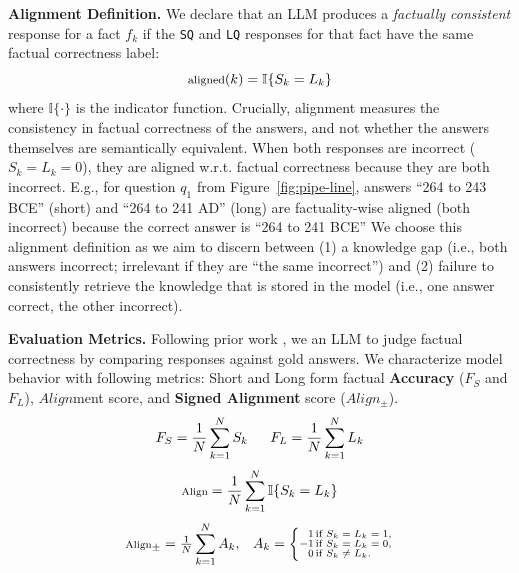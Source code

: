 \documentclass[11pt]{article}
\newcommand{\rparagraph}[1]{\vspace{1.2mm}\noindent\textbf{#1}}
\begin{document}
\rparagraph{Alignment Definition.} 
We declare that an LLM produces a \textit{factually consistent} response for a fact $f_k$ if the \texttt{SQ} and \texttt{LQ} responses for that fact have the same factual correctness label: %
%
\begin{equation}
    \footnotesize
    \text{aligned}(k) = \mathbb{I}\{S_k = L_k\}
\end{equation}
%
\noindent where $\mathbb{I}\{\cdot\}$ is the indicator function. Crucially, alignment measures the consistency in factual correctness of the answers, and not whether the answers themselves are semantically equivalent. When both responses are incorrect ($S_k = L_k = 0$), they are aligned w.r.t. factual correctness because they are both incorrect. 
E.g., for question $q_1$ from Figure~\ref{fig:pipe-line}, answers ``264 to 243 BCE'' (short) and ``264 to 241 AD'' (long) are factuality-wise aligned (both incorrect) because the correct answer is ``264 to 241 BCE''
We choose this alignment definition as we aim to discern between (1) a knowledge gap (i.e., both answers incorrect; irrelevant if they are ``the same incorrect'') and (2) failure to consistently retrieve the knowledge that is stored in the model (i.e., one answer correct, the other incorrect).

\rparagraph{Evaluation Metrics.} 
Following prior work \citep{min2023factscore, wei2024measuring, wei2024long}, we an LLM to judge factual correctness by comparing responses against gold answers. We characterize model behavior with following metrics: Short and Long form factual \textbf{Accuracy} ($F_S$ and $F_L $), $Align$ment score, and \textbf{Signed Alignment} score ($Align_{\pm}$).
%
\begin{equation}
    \scriptsize
    F_S = \frac{1}{N}\sum_{k=1}^{N} S_k 
    \qquad
    F_L = \frac{1}{N}\sum_{k=1}^{N} L_k 
    \label{eq:FS_FL}
\end{equation}
%
\begin{equation}
    \scriptsize
    \text{Align} = \frac{1}{N}\sum_{k=1}^{N} \mathbb{I}\{S_k = L_k\}
    \label{eq:align}
\end{equation}
%
\begin{equation}
    \scriptsize
    \text{Align}_{\pm}=\tfrac{1}{N}\sum_{k=1}^{N}A_k,\quad
    A_k=\left\{\begin{array}{@{}r@{\,}l@{}}
    \ \ 1 & \text{if } S_k=L_k=1,\\[-1pt]
    -1 & \text{if } S_k=L_k=0,\\[-1pt]
    \ \ 0 & \text{if } S_k\neq L_k.
    \end{array}\right.
    \label{eq:signed-align}
\end{equation}
\end{document}
